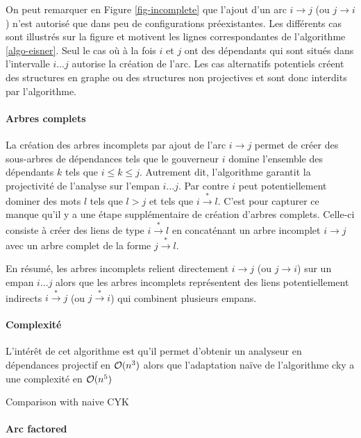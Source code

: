 \documentclass[11pt,openany]{book}
\begin{document}
On peut remarquer en Figure \ref{fig-incomplete} que 
l'ajout d'un arc  $i \rightarrow j$ (ou $j \rightarrow i$)
n'est autorisé que dans peu de configurations préexistantes. Les différents cas sont
illustrés sur la figure et motivent les lignes correspondantes de
l'algorithme \ref{algo-eisner}. Seul le cas où à la fois $i$ et $j$
ont des dépendants qui sont situés dans l'intervalle $i\ldots j$ autorise
la création de l'arc. Les cas alternatifs potentiels créent des
structures en graphe ou des structures non projectives et sont donc interdits par
l'algorithme.

\paragraph{Arbres complets}
La création des arbres incomplets par ajout de l'arc $i\rightarrow j$ permet de créer des sous-arbres de
dépendances tels que le gouverneur $i$ domine l'ensemble des
dépendants $k$ tels que $i\leq k \leq j$. Autrement dit, l'algorithme
garantit la projectivité de l'analyse sur l'empan $i\ldots j$. Par
contre $i$ peut potentiellement dominer des mots $l$ tels que $l > j$
et tels que $i\stackrel{*}{\rightarrow} l$. C'est pour capturer ce
manque qu'il y a une étape supplémentaire de création d'arbres complets. 
Celle-ci consiste à créer des liens de type
$i\stackrel{*}{\rightarrow} l$ en concaténant un arbre incomplet
$i\rightarrow j$ avec un arbre complet de la forme $j\stackrel{*}{\rightarrow} l$.

En résumé, les arbres incomplets relient directement $i\rightarrow j$
(ou $j\rightarrow i$)
sur un empan $i\ldots j$ alors que les arbres incomplets représentent
des liens potentiellement indirects $i\stackrel{*}{\rightarrow} j$ (ou
 $j\stackrel{*}{\rightarrow} i$) qui combinent plusieurs empans.

\paragraph{Complexité}L'intérêt de cet algorithme est qu'il permet d'obtenir un analyseur en
dépendances projectif en ${\cal O}(n^3)$ alors que l'adaptation naïve
de l'algorithme {\sc cky} a une complexité en ${\cal O}(n^5)$

Comparison with naive CYK

\paragraph{Arc factored}
\end{document}
